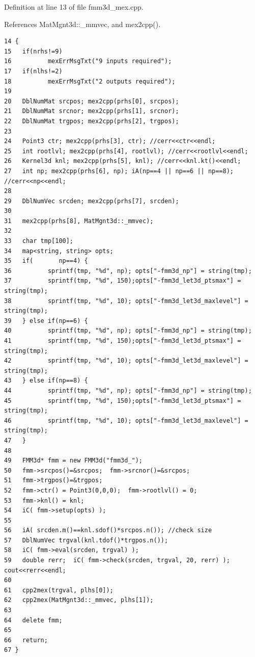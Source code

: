 Definition at line 13 of file fmm3d\_\-mex.cpp.

References Mat\-Mgnt3d::\_\-mmvec, and mex2cpp().

\footnotesize\begin{verbatim}14 {
15   if(nrhs!=9)
16          mexErrMsgTxt("9 inputs required");
17   if(nlhs!=2)
18          mexErrMsgTxt("2 outputs required");
19   
20   DblNumMat srcpos; mex2cpp(prhs[0], srcpos);
21   DblNumMat srcnor; mex2cpp(prhs[1], srcnor);
22   DblNumMat trgpos; mex2cpp(prhs[2], trgpos);
23   
24   Point3 ctr; mex2cpp(prhs[3], ctr); //cerr<<ctr<<endl;
25   int rootlvl; mex2cpp(prhs[4], rootlvl); //cerr<<rootlvl<<endl;
26   Kernel3d knl; mex2cpp(prhs[5], knl); //cerr<<knl.kt()<<endl;
27   int np; mex2cpp(prhs[6], np); iA(np==4 || np==6 || np==8); //cerr<<np<<endl;
28   
29   DblNumVec srcden; mex2cpp(prhs[7], srcden);
30   
31   mex2cpp(prhs[8], MatMgnt3d::_mmvec);
32   
33   char tmp[100];
34   map<string, string> opts;
35   if(       np==4) {
36          sprintf(tmp, "%d", np); opts["-fmm3d_np"] = string(tmp);
37          sprintf(tmp, "%d", 150);opts["-fmm3d_let3d_ptsmax"] = string(tmp);
38          sprintf(tmp, "%d", 10); opts["-fmm3d_let3d_maxlevel"] = string(tmp);
39   } else if(np==6) {
40          sprintf(tmp, "%d", np); opts["-fmm3d_np"] = string(tmp);
41          sprintf(tmp, "%d", 150);opts["-fmm3d_let3d_ptsmax"] = string(tmp);
42          sprintf(tmp, "%d", 10); opts["-fmm3d_let3d_maxlevel"] = string(tmp);
43   } else if(np==8) {
44          sprintf(tmp, "%d", np); opts["-fmm3d_np"] = string(tmp);
45          sprintf(tmp, "%d", 150);opts["-fmm3d_let3d_ptsmax"] = string(tmp);
46          sprintf(tmp, "%d", 10); opts["-fmm3d_let3d_maxlevel"] = string(tmp);
47   }
48   
49   FMM3d* fmm = new FMM3d("fmm3d_");
50   fmm->srcpos()=&srcpos;  fmm->srcnor()=&srcpos;
51   fmm->trgpos()=&trgpos;
52   fmm->ctr() = Point3(0,0,0);  fmm->rootlvl() = 0;
53   fmm->knl() = knl;
54   iC( fmm->setup(opts) );
55   
56   iA( srcden.m()==knl.sdof()*srcpos.n()); //check size
57   DblNumVec trgval(knl.tdof()*trgpos.n());
58   iC( fmm->eval(srcden, trgval) );
59   double rerr;  iC( fmm->check(srcden, trgval, 20, rerr) );  cout<<rerr<<endl;
60   
61   cpp2mex(trgval, plhs[0]);
62   cpp2mex(MatMgnt3d::_mmvec, plhs[1]);
63 
64   delete fmm;
65   
66   return;
67 }
\end{verbatim}\normalsize 


